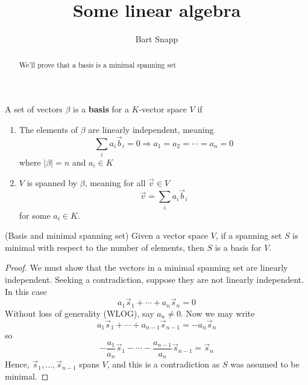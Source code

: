 \documentclass{ximera}
\title{Some linear algebra}         %
\author{Bart Snapp}                 %
\begin{document}
\maketitle                         %

\begin{abstract}
  We'll prove that a basis is a minimal spanning set   %
\end{abstract}

\begin{definition}
  A set of vectors $\beta$ is a \textbf{basis} for a $K$-vector space $V$ if
  \begin{enumerate}
    \item The elements of $\beta$ are linearly independent, meaning
    \[
      \sum_{i} a_i \vec{b}_i = 0 \Rightarrow a_1 = a_2 = \cdots = a_n = 0
    \]
    where $\left| \beta \right| = n$ and $a_i \in K$
    \item $V$ is spanned by $\beta$, meaning for all $\vec{v} \in V$
    \[
      \vec{v} = \sum_{i} a_i \vec{b}_i
    \]
    for some $a_i \in K$.
  \end{enumerate}
\end{definition}

\begin{theorem}
  (Basis and minimal spanning set) Given a vector space $V$, if a spanning set $S$ is minimal with respect to the number of elements, then $S$ is a basis for $V$.
  \begin{proof}
    We must show that the vectors in a minimal spanning set are linearly independent. Seeking a contradiction, suppose they are not linearly independent. In this case
    \[
      a_1 \vec{s}_1 + \cdots + a_n \vec{s}_n = 0
    \]
    Without loss of generality (WLOG), say $a_n \neq 0$. Now we may write
    \[
      a_1 \vec{s}_1 + \cdots + a_{n-1} \vec{s}_{n-1} = -a_n \vec{s}_n
    \]
    so
    \[
      -\frac{a_1}{a_n} \vec{s}_1 - \cdots - \frac{a_{n-1}}{a_n} \vec{s}_{n-1} = \vec{s}_n
    \]
    Hence, $\vec{s}_1, \ldots, \vec{s}_{n-1}$ spans $V$, and this is a contradiction as $S$ was assumed to be minimal.
  \end{proof}
\end{theorem}
\end{document}
